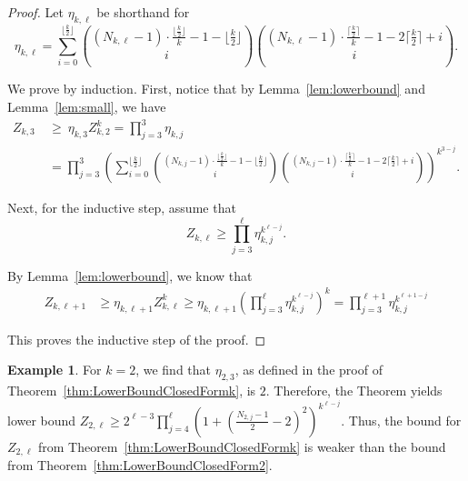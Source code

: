 \documentclass[11pt]{article}
\theoremstyle{remark}
\theoremstyle{definition}
\newtheorem{example}[theorem]{Example}
\begin{document}
\begin{proof}

Let $\eta_{k, \ell}$ be shorthand for $$\eta_{k, \ell} =\sum_{i=0}^{\lfloor \frac{k}{2} \rfloor}\binom{(N_{k, \ell}-1) \cdot \frac{\lfloor \frac{k}{2} \rfloor}{k} -1-\lfloor \frac{k}{2}  \rfloor}{i} \binom{(N_{k, \ell}-1) \cdot \frac{\lceil \frac{k}{2} \rceil}{k} -1-2\lceil \frac{k}{2}  \rceil+i}{i}.$$

We prove by induction. First, notice that by Lemma~\ref{lem:lowerbound} and Lemma~\ref{lem:small}, we have \begin{align*}
Z_{k, 3} & \ \ge \ \eta_{k, 3} Z^k_{k, 2} = \prod_{j=3}^{3} \eta_{k, j} \\ 
& \ = \prod_{j=3}^{3} \left(\sum_{i=0}^{\lfloor \frac{k}{2} \rfloor}\binom{(N_{k, j}-1) \cdot \frac{\lfloor \frac{k}{2} \rfloor}{k} -1-\lfloor \frac{k}{2}  \rfloor}{i} \binom{(N_{k, j}-1) \cdot \frac{\lceil \frac{k}{2} \rceil}{k} -1-2\lceil \frac{k}{2}  \rceil+i}{i}\right)^{k^{3-j}}.
\end{align*}

Next, for the inductive step, assume that $$Z_{k,\ell} \ge \prod_{j=3}^{\ell} \eta_{k, j}^{k^{\ell-j}}.$$

By Lemma~\ref{lem:lowerbound}, we know that 
\begin{align*}
Z_{k, \ell+1} & \ge \eta_{k, \ell+1} Z^k_{k, \ell}  \ge \eta_{k, \ell+1}\left(\prod_{j=3}^{\ell}\eta_{k, j}^{k^{\ell-j}}\right)^k  = \prod_{j=3}^{\ell+1}\eta_{k, j}^{k^{\ell+1-j}}
\end{align*}

This proves the inductive step of the proof.
\end{proof}

\begin{example}
    For $k=2$, we find that $\eta_{2, 3}$, as defined in the proof of Theorem~\ref{thm:LowerBoundClosedFormk}, is $2$. Therefore, the Theorem yields lower bound $Z_{2, \ell} \geq 2^{\ell-3}\prod_{j=4}^{\ell}\left(1 + (\frac{N_{2, j}-1}{2}-2)^2\right)^{k^{\ell-j}}$. Thus, the bound for $Z_{2, \ell}$ from Theorem~\ref{thm:LowerBoundClosedFormk} is weaker than the bound from Theorem~\ref{thm:LowerBoundClosedForm2}.
\end{example}
\end{document}
